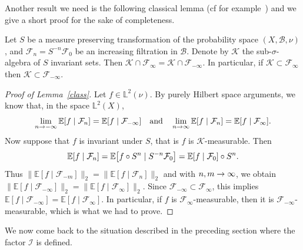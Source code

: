\documentclass[AHL,Unicode,longabstracts,published]{cedram}
\newcommand*\bbL{\mathbb{L}}
\newcommand{\bbE}{\mathbb{E}}
\newcommand{\E}[1]{\bbE\left[#1\right]}
\newcommand*\I{\mathcal{I}}
\newcommand*\B{\mathcal{B}}
\newcommand*\F{\mathcal{F}}
\newcommand*\K{\mathcal{K}}
\renewcommand*{\to}{\mathchoice{\longrightarrow}{\rightarrow}{\rightarrow}{\rightarrow}}
\let\originalleft\left
\let\originalright\right
\renewcommand{\left}{\mathopen{}\mathclose\bgroup\originalleft}
\renewcommand{\right}{\aftergroup\egroup\originalright}
\begin{document}
Another result we need is the following classical lemma (cf for example~\cite{MR262464}) and we give a short proof for the sake of completeness.
\begin{lemm} \label{class}
Let $S$ be a measure preserving transformation of the probability space $(X,\B,\nu)$, and $\F_n = S^{-n}\F_0$ be an increasing filtration in $\B$. Denote by $\K$ the sub-$\sigma$-algebra of $S$ invariant sets. Then $\K \cap \F_{\infty}=\K \cap \F_{-\infty}$.
In particular, if $\K \subset \F_{\infty}$ then $\K \subset \F_{-\infty}$.
\end{lemm}
\begin{proof}[Proof of Lemma~\ref{class}]
Let $f\in \bbL^2(\nu)$. By purely Hilbert space arguments, we know that, in the space $ \bbL^2(X)$,
\[
\lim_{n\to-\infty}\E{f\mid\F_n}=\E{f\mid\F_{-\infty}}
\quad\text{and}\quad \lim_{n\to\infty}\E{f\mid\F_n}=\E{f\mid\F_{\infty}}.
\]
Now suppose that $f$ is invariant under $S$, that is $f$ is $\K$-measurable. Then
\[
\E{f\mid\F_n}=\E{f\circ S^n\mid S^{-n}\F_0}=\E{f\mid\F_0 }\circ S^n.
\]
Thus $\|\bbE[f\mid\F_{-m}]\|_2=\|\bbE[f\mid\F_n]\|_2$ and with $n,m\to\infty$, we obtain $\|\bbE[f\mid\F_{-\infty}]\|_2=\|\bbE[f\mid\F_\infty]\|_2$. Since $\F_{-\infty}\subset\F_\infty$, this implies $
\bbE[f\mid\F_{-\infty}]=\bbE[f\mid\F_{\infty}] $. In particular, if $f$ is $\F_{\infty}$-measurable, then it is $\F_{-\infty}$-measurable, which is what we had to prove.
\end{proof}

We now come back to the situation described in the preceding section where the factor $\I$ is defined.
\end{document}
